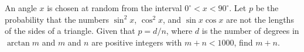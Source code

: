 An angle $x$ is chosen at random from the interval $0^\circ < x < 90^\circ$.  Let $p$ be the probability that the numbers $\sin^2 x$, $\cos^2 x$, and $\sin x \cos x$ are not the lengths of the sides of a triangle.  Given that $p = d/n$, where $d$ is the number of degrees in $\arctan m$ and $m$ and $n$ are positive integers with $m + n < 1000$, find $m + n$.